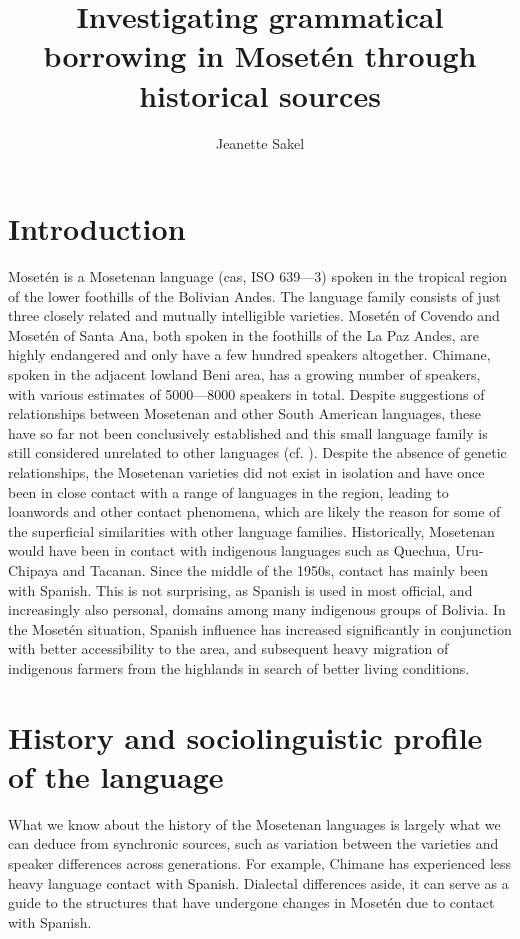 \documentclass[output=paper,colorlinks,citecolor=brown
]{langscibook}
\author{Jeanette Sakel\orcid{}\affiliation{University of the West of England}}
\title[Investigating grammatical borrowing in Mosetén]{Investigating grammatical borrowing in Mosetén through historical sources}
\begin{document}
\maketitle

\section{Introduction}
Mosetén is a Mosetenan language (cas, ISO 639—3) spoken in the tropical region of the lower foothills of the Bolivian Andes. The language family consists of just three closely related and mutually intelligible varieties. Mosetén of Covendo and Mosetén of Santa Ana, both spoken in the foothills of the La Paz Andes, are highly endangered and only have a few hundred speakers altogether. Chimane, spoken in the adjacent lowland Beni area, has a growing number of speakers, with various estimates of 5000—8000 speakers in total. Despite suggestions of relationships between Mosetenan and other South American languages, these have so far not been conclusively established and this small language family is still considered unrelated to other languages (cf. \citep{sakel2004grammar}). Despite the absence of genetic relationships, the Mosetenan varieties did not exist in isolation and have once been in close contact with a range of languages in the region, leading to loanwords and other contact phenomena, which are likely the reason for some of the superficial similarities with other language families. Historically, Mosetenan would have been in contact with indigenous languages such as Quechua, Uru-Chipaya and Tacanan. Since the middle of the 1950s, contact has mainly been with Spanish. This is not surprising, as Spanish is used in most official, and increasingly also personal, domains among many indigenous groups of Bolivia. In the Mosetén situation, Spanish influence has increased significantly in conjunction with better accessibility to the area, and subsequent heavy migration of indigenous farmers from the highlands in search of better living conditions.


\section{History and sociolinguistic profile of the language}
What we know about the history of the Mosetenan languages is largely what we can deduce from synchronic sources, such as variation between the varieties and speaker differences across generations. For example, Chimane has experienced less heavy language contact with Spanish. Dialectal differences aside, it can serve as a guide to the structures that have undergone changes in Mosetén due to contact with Spanish.
\end{document}
